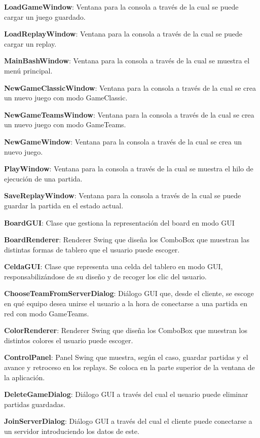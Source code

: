 \documentclass[12pt,a4paper,openright]{book}
\theoremstyle{break}
\begin{document}
\textbf{LoadGameWindow}: Ventana para la consola a través de la cual se puede cargar un juego guardado.

\textbf{LoadReplayWindow}: Ventana para la consola a través de la cual se puede cargar un replay.

\textbf{MainBashWindow}: Ventana para la consola a través de la cual se muestra el menú principal.

\textbf{NewGameClassicWindow}: Ventana para la consola a través de la cual se crea un nuevo juego con modo GameClassic.

\textbf{NewGameTeamsWindow}: Ventana para la consola a través de la cual se crea un nuevo juego con modo GameTeams.

\textbf{NewGameWindow}: Ventana para la consola a través de la cual se crea un nuevo juego.

\textbf{PlayWindow}: Ventana para la consola a través de la cual se muestra el hilo de ejecución de una partida.

\textbf{SaveReplayWindow}: Ventana para la consola a través de la cual se puede guardar la partida en el estado actual.

\textbf{BoardGUI}: Clase que gestiona la representación del board en modo GUI

\textbf{BoardRenderer}: Renderer Swing que diseña los ComboBox que muestran las distintas formas de tablero que el usuario puede escoger.

\textbf{CeldaGUI}: Clase que representa una celda del tablero en modo GUI, responsabilizándose de su diseño y de recoger los clic del usuario.

\textbf{ChooseTeamFromServerDialog}: Diálogo GUI que, desde el cliente, se escoge en qué equipo desea unirse el usuario a la hora de conectarse a una partida en red con modo GameTeams.

\textbf{ColorRenderer}: Renderer Swing que diseña los ComboBox que muestran los distintos colores el usuario puede escoger.

\textbf{ControlPanel}: Panel Swing que muestra, según el caso, guardar partidas y el avance y retroceso en los replays. Se coloca en la parte superior de la ventana de la aplicación.

\textbf{DeleteGameDialog}: Diálogo GUI a través del cual el usuario puede eliminar partidas guardadas.

\textbf{JoinServerDialog}: Diálogo GUI a través del cual el cliente puede conectarse a un servidor introduciendo los datos de este.
\end{document}

